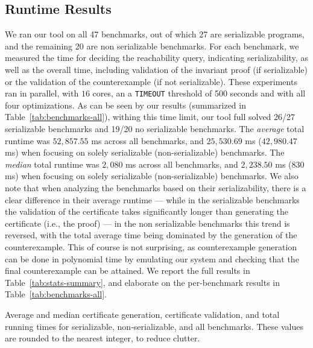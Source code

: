 \subsection{Runtime Results}
We ran our tool on all 47 benchmarks, out of which 27 are serializable programs, and the remaining 20 are non serializable benchmarks. 
For each benchmark, we measured the time for deciding the reachability query, indicating serializability, as well as the overall time, including validation of the invariant proof (if serializable) or the validation of the counterexample (if not serializable). These experiments ran in parallel, with $16$ cores, an a \texttt{TIMEOUT} threshold of 500 seconds and with all four optimizations. As can be seen by our results (summarized in Table~\ref{tab:benchmarks-all}), withing this time limit, our tool full solved 26/27 serializable benchmarks 
and 19/20 no serializable benchmarks. 
%
The \textit{average} total runtime was $52{,}857.55$ ms across all benchmarks, and $25{,}530.69$ ms ($42{,}980.47$ ms) when focusing on solely serializable (non-serializable) benchmarks.
%
The \textit{median} total runtime was $2{,}080$ ms across all benchmarks, and $2{,}238.50$ ms ($830$ ms) when focusing on solely serializable (non-serializable) benchmarks.
%
We also note that when analyzing the benchmarks based on their serializability, there is a clear difference in their average runtime --- while in the serializable benchmarks the validation of the certificate takes significantly longer than generating the certificate (i.e., the proof) --- in the non serializable benchmarks this trend is reversed, with the total average time being dominated by the generation of the counterexample. This of course is not surprising, as counterexample generation can be done in polynomial time by emulating our  system and checking that the final counterexample can be attained.
%
We report the full results in Table~\ref{tab:stats-summary}, and elaborate on the per-benchmark results in Table~\ref{tab:benchmarks-all}.





\begin{table}[H]
	\centering
	
\caption{Average and median certificate generation, certificate validation, and total running times for serializable, non‐serializable, and all benchmarks. These values are rounded to the nearest integer, to reduce clutter.}
\label{tab:stats-summary}
\end{table}





